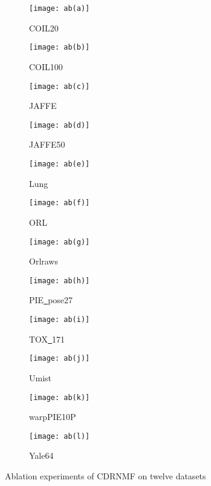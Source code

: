 \documentclass[a4paper,fleqn]{cas-sc}
\begin{document}
\begin{figure}[h]
	\centering
	\begin{subfigure}[b]{.23\textwidth}
		\centering
		\texttt{[image: ab(a)]}
		\caption{COIL20}\label{subfig:ab(a)}
	\end{subfigure}
	\begin{subfigure}[b]{.23\textwidth}
		\centering
		\texttt{[image: ab(b)]}
		\caption{COIL100}\label{subfig:ab(b)}
	\end{subfigure}
	\begin{subfigure}[b]{.23\textwidth}
		\centering
		\texttt{[image: ab(c)]}
		\caption{JAFFE}\label{subfig:ab(c)}
	\end{subfigure}
	\begin{subfigure}[b]{.23\textwidth}
		\centering
		\texttt{[image: ab(d)]}
		\caption{JAFFE50}\label{subfig:ab(d)}
	\end{subfigure}
	
	\quad
	
	\begin{subfigure}[b]{.23\textwidth}
		\centering
		\texttt{[image: ab(e)]}
		\caption{Lung}\label{subfig:ab(e)}
	\end{subfigure}
	\begin{subfigure}[b]{.23\textwidth}
		\centering
		\texttt{[image: ab(f)]}
		\caption{ORL}\label{subfig:ab(f)}
	\end{subfigure}
	\begin{subfigure}[b]{.23\textwidth}
		\centering
		\texttt{[image: ab(g)]}
		\caption{Orlraws}\label{subfig:ab(g)}
	\end{subfigure}
	\begin{subfigure}[b]{.23\textwidth}
		\centering
		\texttt{[image: ab(h)]}
		\caption{PIE\underline{~}pose27}\label{subfig:ab(h)}
	\end{subfigure}
	
	\quad
	
	\begin{subfigure}[b]{.23\textwidth}
		\centering
		\texttt{[image: ab(i)]}
		\caption{TOX\underline{~}171}\label{subfig:ab(i)}
	\end{subfigure}
	\begin{subfigure}[b]{.23\textwidth}
		\centering
		\texttt{[image: ab(j)]}
		\caption{Umist}\label{subfig:ab(j)}
	\end{subfigure}
	\begin{subfigure}[b]{.23\textwidth}
		\centering
		\texttt{[image: ab(k)]}
		\caption{warpPIE10P}\label{subfig:ab(k)}
	\end{subfigure}
	\begin{subfigure}[b]{.23\textwidth}
		\centering
		\texttt{[image: ab(l)]}
		\caption{Yale64}\label{subfig:ab(l)}
	\end{subfigure}
	\caption{Ablation experiments of CDRNMF on twelve datasets}
	\label{fig:ab}
\end{figure}
\end{document}
